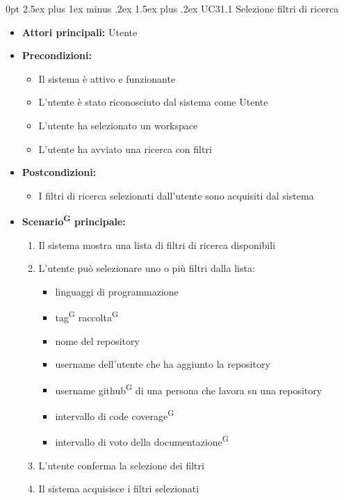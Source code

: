 \documentclass[a4paper, 11pt]{article}
\makeatletter
\renewcommand\paragraph{\@startsection{paragraph}{4}
  {0pt}
  {2.5ex plus 1ex minus .2ex}
  {1.5ex plus .2ex}
  {\normalfont\normalsize\bfseries\color{AccentDark}}}
\makeatother
\begin{document}
\paragraph{UC31.1 Selezione filtri di ricerca} \label{UC31.1}
\begin{itemize}
	\item \textbf{Attori principali:} Utente
	\item \textbf{Precondizioni:}
	\begin{itemize}
		\item Il sistema è attivo e funzionante
		\item L'utente è stato riconosciuto dal sistema come Utente
		\item L'utente ha selezionato un workspace
		\item L'utente ha avviato una ricerca con filtri
	\end{itemize}
	\item \textbf{Postcondizioni:} 
	\begin{itemize}
		\item I filtri di ricerca selezionati dall'utente sono acquisiti dal sistema
	\end{itemize}
	\item \textbf{Scenario\textsuperscript{G} principale:}
	\begin{enumerate}
		\item Il sistema mostra una lista di filtri di ricerca disponibili 
		\item L'utente può selezionare uno o più filtri dalla lista:
		\begin{itemize}
			\item linguaggi di programmazione
			\item tag\textsuperscript{G} raccolta\textsuperscript{G}
			\item nome del repository
			\item username dell'utente che ha aggiunto la repository
			\item username github\textsuperscript{G} di una persona che lavora su una repository 
			\item intervallo di code coverage\textsuperscript{G}
			\item intervallo di voto della documentazione\textsuperscript{G}
		\end{itemize}
		\item L'utente conferma la selezione dei filtri
		\item Il sistema acquisisce i filtri selezionati
	\end{enumerate}

\end{itemize}
\end{document}
